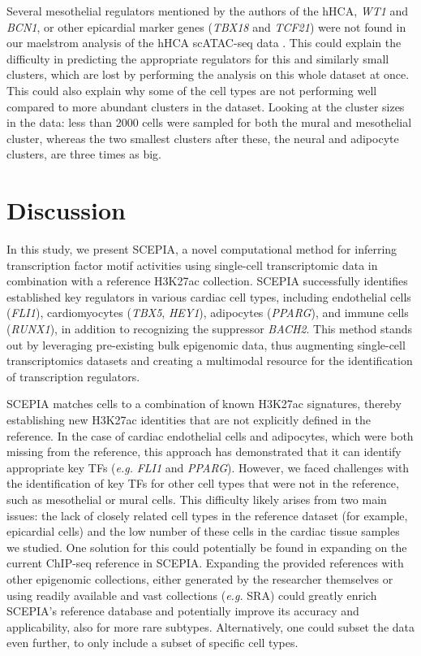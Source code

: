 Several mesothelial regulators mentioned by the authors of the hHCA, \textit{WT1} and \textit{BCN1}, or other epicardial marker genes (\textit{TBX18} and \textit{TCF21}) were not found in our maelstrom analysis of the hHCA scATAC-seq data \cite{Wu2013}. This could explain the difficulty in predicting the appropriate regulators for this and similarly small clusters, which are lost by performing the analysis on this whole dataset at once. This could also explain why some of the cell types are not performing well compared to more abundant clusters in the dataset. Looking at the cluster sizes in the data: less than 2000 cells were sampled for both the mural and mesothelial cluster, whereas the two smallest clusters after these, the neural and adipocyte clusters, are three times as big.

\section{Discussion}

In this study, we present SCEPIA, a novel computational method for inferring transcription factor motif activities using single-cell transcriptomic data in combination with a reference H3K27ac collection. SCEPIA successfully identifies established key regulators in various cardiac cell types, including endothelial cells (\textit{FLI1}), cardiomyocytes (\textit{TBX5}, \textit{HEY1}), adipocytes (\textit{PPARG}), and immune cells (\textit{RUNX1}), in addition to recognizing the suppressor \textit{BACH2}. This method stands out by leveraging pre-existing bulk epigenomic data, thus augmenting single-cell transcriptomics datasets and creating a multimodal resource for the identification of transcription regulators.

SCEPIA matches cells to a combination of known H3K27ac signatures, thereby establishing new H3K27ac identities that are not explicitly defined in the reference. In the case of cardiac endothelial cells and adipocytes, which were both missing from the reference, this approach has demonstrated that it can identify appropriate key TFs (\textit{e.g.} \textit{FLI1} and \textit{PPARG}). However, we faced challenges with the identification of key TFs for other cell types that were not in the reference, such as mesothelial or mural cells. This difficulty likely arises from two main issues: the lack of closely related cell types in the reference dataset (for example, epicardial cells) and the low number of these cells in the cardiac tissue samples we studied. One solution for this could potentially be found in expanding on the current ChIP-seq reference in SCEPIA. Expanding the provided references with other epigenomic collections, either generated by the researcher themselves or using readily available and vast collections (\textit{e.g.} SRA) could greatly enrich SCEPIA's reference database and potentially improve its accuracy and applicability, also for more rare subtypes. Alternatively, one could subset the data even further, to only include a subset of specific cell types. 

